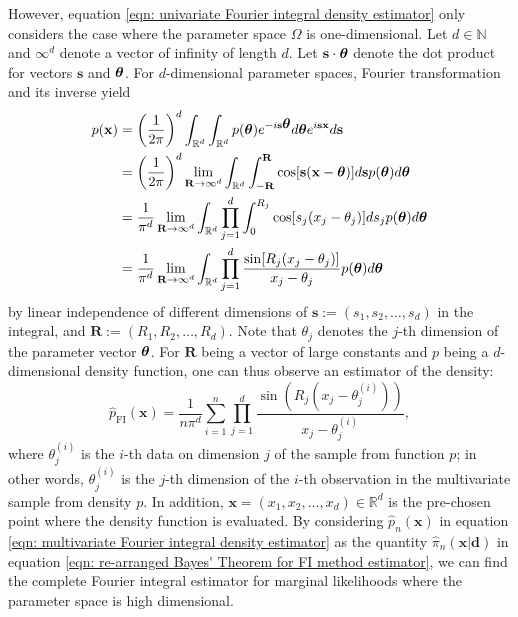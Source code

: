 \documentclass[%
 reprint,
 amsmath,amssymb,
 aps,
]{revtex4-2}
\def\N{\mathbb{N}}
\def\R{\mathbb{R}}
\def\ybold{\mathbf{d}}
\def\xbold{\mathbf{x}}
\def\sbold{\mathbf{s}}
\def\Rbold{\mathbf{R}}
\newcommand{\btheta}{\mbox{\boldmath $\theta$}}
\begin{document}
However, equation \eqref{eqn: univariate Fourier integral density estimator} only considers the case where the parameter space $\Omega$ is one-dimensional. Let  $d \in \N$ and $\infty^d$ denote a vector of infinity of length $d$. Let $\mathbf{s} \cdot \btheta$ denote the dot product for vectors $\mathbf{s}$ and $\btheta$. For $d$-dimensional parameter spaces, Fourier transformation and its inverse yield
\begin{align} \label{eqn: multivariate Fourier integral}
    p(\xbold) & = \left(\frac{1}{2\pi}\right)^d\int_{\R^d} \int_{\R^d}p(\btheta) e^{-i\sbold\btheta}d\btheta e^{i\sbold\xbold}d\sbold \\
    & = \left(\frac{1}{2\pi}\right)^d \lim_{\Rbold \to \infty^d} \int_{\R^d} \int_{-\Rbold}^\Rbold \cos[\sbold(\xbold-\btheta)]d\sbold p(\btheta)d\btheta \\
    & = \frac{1}{\pi^d} \lim_{\Rbold \to \infty^d} \int_{\R^d} \prod_{j=1}^d \int_0^{R_j} \cos[s_j(x_j-\theta_j)]ds_j p(\btheta)d\btheta \\
    & = \frac{1}{\pi^d} \lim_{\Rbold \to \infty^d} \int_{\R^d} \prod_{j=1}^d \frac{\sin[R_j(x_j-\theta_j)]}{x_j-\theta_j} p(\btheta)d\btheta
\end{align}
by linear independence of different dimensions of $\sbold := (s_1, s_2, \ldots, s_d)$ in the integral, and $\Rbold := (R_1, R_2, \ldots, R_d)$. Note that $\theta_j$ denotes the $j$-th dimension of the parameter vector $\btheta$. For $\Rbold$ being a vector of large constants and $p$ being a $d$-dimensional density function, one can thus observe an estimator of the density:
\begin{equation} \label{eqn: multivariate Fourier integral density estimator}
    \hat{p}_\text{FI}(\mathbf{x}) = \frac{1}{n\pi^d}\sum_{i = 1}^n \prod_{j = 1}^d \frac{\sin(R_j(x_j - \theta_j^{(i)}))}{x_j - \theta_j^{(i)}},
\end{equation}
where $\theta_j^{(i)}$ is the $i$-th data on dimension $j$ of the sample from function $p$; in other words, $\theta_j^{(i)}$ is the $j$-th dimension of the $i$-th observation in the multivariate sample from density $p$. In addition, $\mathbf{x} = (x_1, x_2, \ldots, x_d) \in \R^d$ is the pre-chosen point where the density function is evaluated. By considering $\hat{p}_n(\mathbf{x})$ in equation \eqref{eqn: multivariate Fourier integral density estimator} as the quantity $\hat{\pi}_n (\xbold | \ybold)$ in equation \eqref{eqn: re-arranged Bayes' Theorem for FI method estimator}, we can find the complete Fourier integral estimator for marginal likelihoods where the parameter space is high dimensional.
\end{document}
